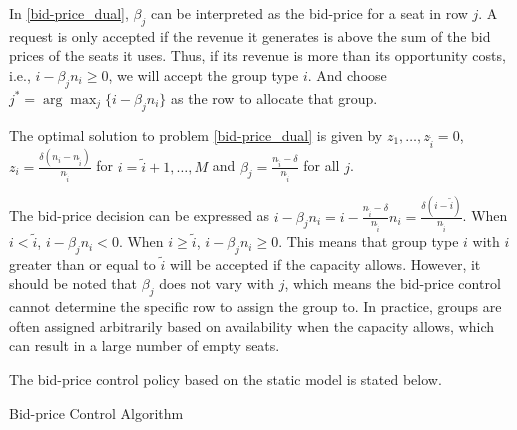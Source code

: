 In \eqref{bid-price_dual}, $\beta_{j}$ can be interpreted as the bid-price for a seat in row $j$. A request is only accepted if the revenue it generates is above the sum of the bid prices of the seats it uses. Thus, if its revenue is more than its opportunity costs, i.e., $i -\beta_{j} n_i \geq 0$, we will accept the group type $i$. And choose $j^{*} = \arg \max_{j} \{i -\beta_{j} n_i\}$ as the row to allocate that group.


\begin{lem}\label{bid-price}
 The optimal solution to problem \eqref{bid-price_dual} is given by $z_1 ,\ldots, z_{\tilde{i}} =0$, $z_{i} = \frac{\delta(n_i-n_{\tilde{i}})}{n_{\tilde{i}}}$ for $i = \tilde{i}+1, \ldots, M$ and $\beta_j = \frac{n_{\tilde{i}} - \delta}{n_{\tilde{i}}}$ for all $j$.
\end{lem}

The bid-price decision can be expressed as $i - \beta_j n_i = i - \frac{n_{\tilde{i}} - \delta}{n_{\tilde{i}}} n_i = \frac{\delta (i - \tilde{i})}{n_{\tilde{i}}}$. When $i < \tilde{i}$, $i - \beta_j n_i < 0$. When $i \geq \tilde{i}$, $i - \beta_j n_i \geq 0$. This means that group type $i$ with $i$ greater than or equal to $\tilde{i}$ will be accepted if the capacity allows. However, it should be noted that $\beta_j$ does not vary with $j$, which means the bid-price control cannot determine the specific row to assign the group to. In practice, groups are often assigned arbitrarily based on availability when the capacity allows, which can result in a large number of empty seats.

The bid-price control policy based on the static model is stated below.

\begin{algorithm}[H]
  \caption{Bid-price Control Algorithm}\label{algo_bid}
\end{algorithm}


